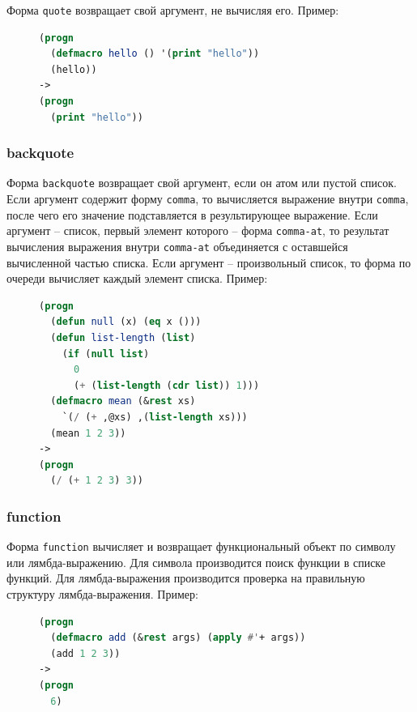 Форма \texttt{quote} возвращает свой аргумент, не вычисляя его. Пример:

\begin{figure}[H]
\begin{lstlisting}[language=Lisp]
(progn
  (defmacro hello () '(print "hello"))
  (hello))
->
(progn
  (print "hello"))
\end{lstlisting}
\end{figure}

\subsubsection{backquote}

Форма \texttt{backquote} возвращает свой аргумент, если он атом или пустой список. Если аргумент содержит форму \texttt{comma}, то вычисляется выражение внутри \texttt{comma}, после чего его значение подставляется в результирующее выражение. Если аргумент -- список, первый элемент которого -- форма \texttt{comma-at}, то результат вычисления выражения внутри \texttt{comma-at} объединяется с оставшейся вычисленной частью списка. Если аргумент -- произвольный список, то форма по очереди вычисляет каждый элемент списка. Пример:

\begin{figure}[H]
\begin{lstlisting}[language=Lisp]
(progn
  (defun null (x) (eq x ()))
  (defun list-length (list)
    (if (null list)
      0
      (+ (list-length (cdr list)) 1)))
  (defmacro mean (&rest xs)
    `(/ (+ ,@xs) ,(list-length xs)))
  (mean 1 2 3))
->
(progn
  (/ (+ 1 2 3) 3))
\end{lstlisting}
\end{figure}

\subsubsection{function}

Форма \texttt{function} вычисляет и возвращает функциональный объект по символу или лямбда-выражению. Для символа производится поиск функции в списке функций. Для лямбда-выражения производится проверка на правильную структуру лямбда-выражения. Пример:

\begin{figure}[H]
\begin{lstlisting}[language=Lisp]
(progn
  (defmacro add (&rest args) (apply #'+ args))
  (add 1 2 3))
->
(progn
  6)
\end{lstlisting}
\end{figure}

